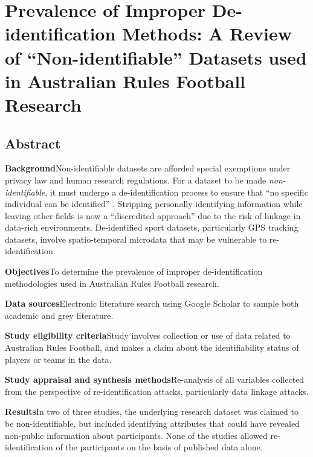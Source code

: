 
\section{Prevalence of Improper De-identification Methods: A Review of ``Non-identifiable'' Datasets used in Australian Rules Football Research}
\label{ch:ethics-details}


\subsection{Abstract}


\textbf{Background}\hs Non-identifiable datasets are afforded special exemptions under privacy law and human research regulations. For a dataset to be made \textit{non-identifiable}, it must undergo a de-identification process to ensure that ``no specific individual can be identified'' \cite{NationalStatement2015}. Stripping personally identifying information while leaving other fields is now a ``discredited approach'' \cite{Ohm2010} due to the risk of linkage in data-rich environments. De-identified sport datasets, particularly GPS tracking datasets, involve spatio-temporal microdata that may be vulnerable to re-identification.

\textbf{Objectives}\hs To determine the prevalence of improper de-identification methodologies used in Australian Rules Football research.

\textbf{Data sources}\hs Electronic literature search using Google Scholar to sample both academic and grey literature.

\textbf{Study eligibility criteria}\hs Study involves collection or use of data related to Australian Rules Football, and makes a claim about the identifiability status of players or teams in the data.

\textbf{Study appraisal and synthesis methods}\hs Re-analysis of all variables collected from the perspective of re-identification attacks, particularly data linkage attacks.

\textbf{Results}\hs In two of three studies, the underlying research dataset was claimed to be non-identifiable, but included identifying attributes that could have revealed non-public information about participants. None of the studies allowed re-identification of the participants on the basis of published data alone.

